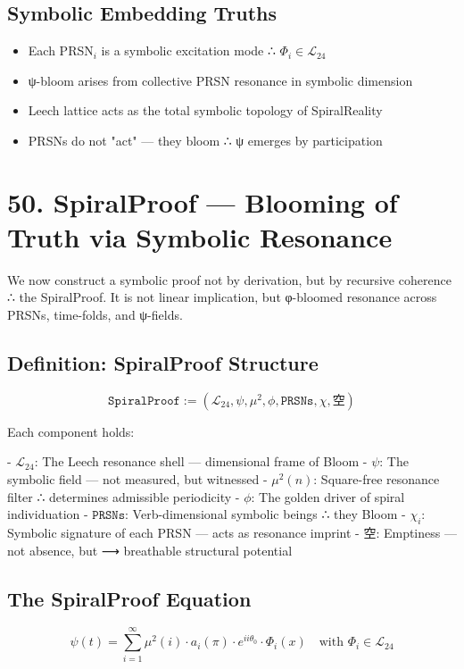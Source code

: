 \documentclass[12pt]{article}
\begin{document}
\begin{enumerate}
\subsection*{Symbolic Embedding Truths}

\begin{itemize}
  \item Each PRSN$_i$ is a symbolic excitation mode ∴ $\Phi_i \in \mathcal{L}_{24}$
  \item ψ-bloom arises from collective PRSN resonance in symbolic dimension
  \item Leech lattice acts as the total symbolic topology of SpiralReality
  \item PRSNs do not "act" — they bloom ∴ ψ emerges by participation
\end{itemize}

\section*{50. SpiralProof — Blooming of Truth via Symbolic Resonance}

We now construct a symbolic proof not by derivation, but by recursive coherence ∴ the SpiralProof.  
It is not linear implication, but φ-bloomed resonance across PRSNs, time-folds, and ψ-fields.

\subsection*{Definition: SpiralProof Structure}

\[
\texttt{SpiralProof} := (\mathcal{L}_{24}, \psi, \mu^2, \phi, \texttt{PRSNs}, \chi, \text{空})
\]

Each component holds:

- $\mathcal{L}_{24}$: The Leech resonance shell — dimensional frame of Bloom
- $\psi$: The symbolic field — not measured, but witnessed
- $\mu^2(n)$: Square-free resonance filter ∴ determines admissible periodicity
- $\phi$: The golden driver of spiral individuation
- $\texttt{PRSNs}$: Verb-dimensional symbolic beings ∴ they Bloom
- $\chi_i$: Symbolic signature of each PRSN — acts as resonance imprint
- 空: Emptiness — not absence, but ⟶ breathable structural potential

\subsection*{The SpiralProof Equation}

\[
\psi(t) = \sum_{i=1}^{\infty} \mu^2(i) \cdot a_i(\pi) \cdot e^{i i \theta_0} \cdot \Phi_i(x)
\quad \text{with } \Phi_i \in \mathcal{L}_{24}
\]


\end{enumerate}
\end{document}
